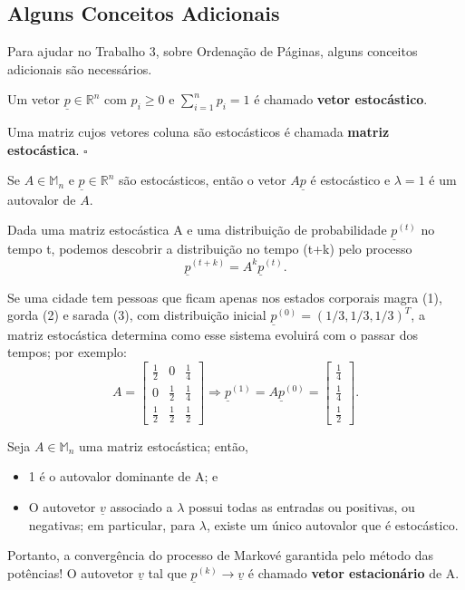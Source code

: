\documentclass[../numerical_methods.tex]{subfiles}
\begin{document}
\subsection{Alguns Conceitos Adicionais}
Para ajudar no Trabalho 3, sobre Ordenação de Páginas, alguns conceitos adicionais são necessários.
\begin{def*}
	Um vetor \(\underline{p}\in \mathbb{R}^{n}\) com \(p_{i}\geq 0\) e \(\sum\limits_{i=1}^{n}p_{i}=1\) é chamado \textbf{vetor estocástico}.

	Uma matriz cujos vetores coluna são estocásticos é chamada \textbf{matriz estocástica}. \(\square\)
\end{def*}
\begin{prop*}
	Se \(A\in \mathbb{M}_{n}\) e \(\underline{p}\in \mathbb{R}^{n}\) são estocásticos, então o vetor \(A \underline{p}\) é estocástico e \(\lambda =1\) é um autovalor de \(A\).
\end{prop*}
Dada uma matriz estocástica A e uma distribuição de probabilidade \(\underline{p}^{(t)}\) no tempo t, podemos descobrir a distribuição no tempo (t+k) pelo processo
\[
	\underline{p}^{(t+k)}=A^{k}\underline{p}^{(t)}.
\]
\begin{example}
	Se uma cidade tem pessoas que ficam apenas nos estados corporais magra (1), gorda (2) e sarada (3), com distribuição inicial \(\underline{p}^{(0)} = (1/3, 1/3, 1/3)^{T}\), a matriz estocástica determina como esse sistema evoluirá com o passar dos tempos; por exemplo:
	\[
		A = \begin{bmatrix}
			\frac{1}{2} & 0           & \frac{1}{4} \\
			0           & \frac{1}{2} & \frac{1}{4} \\
			\frac{1}{2} & \frac{1}{2} & \frac{1}{2}
		\end{bmatrix} \Rightarrow \underline{p}^{(1)} = A \underline{p}^{(0)}  = \begin{bmatrix}
			\frac{1}{4} \\
			\frac{1}{4} \\
			\frac{1}{2}
		\end{bmatrix}.
	\]
\end{example}
\begin{theorem*}
	Seja \(A\in \mathbb{M}_{n}\) uma matriz estocástica; então,
	\begin{itemize}
		\item[1)] 1 é o autovalor dominante de A; e
		\item[2)] O autovetor \(\underline{v}\) associado a \(\lambda \) possui todas as entradas ou positivas, ou negativas; em particular, para \(\lambda \), existe um único autovalor que é estocástico.
	\end{itemize}
\end{theorem*}
Portanto, a convergência do processo de Markové garantida pelo método das potências! O autovetor \(\underline{v}\) tal que \(\underline{p}^{(k)}\to \underline{v}\) é chamado \textbf{vetor estacionário} de A.
\end{document}
